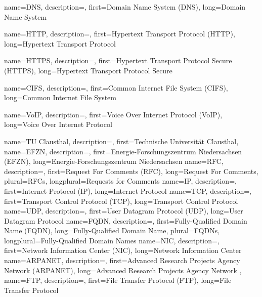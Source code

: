 {%
    name={DNS},
    description={},
    first={Domain Name System (DNS)},
    long={Domain Name System}
}

{%
    name={HTTP},
    description={},
    first={Hypertext Transport Protocol (HTTP)},
    long={Hypertext Transport Protocol}

}
{%
    name={HTTPS},
    description={},
    first={Hypertext Transport Protocol Secure (HTTPS)},
    long={Hypertext Transport Protocol Secure}

}
{%
    name={CIFS},
    description={},
    first={Common Internet File System (CIFS)},
    long={Common Internet File System}

}
{%
    name={VoIP},
    description={},
    first={Voice Over Internet Protocol (VoIP)},
    long={Voice Over Internet Protocol}

}
{%
    name={TU Clausthal},
    description={},
    first={Technische Universität Clausthal},
}
{%
    name={EFZN},
    description={},
    first={Energie-Forschungszentrum Niedersachsen (EFZN)},
    long={Energie-Forschungszentrum Niedersachsen}
}
{%
    name={RFC},
    description={},
    first={Request For Comments (RFC)},
    long={Request For Comments},
    plural={RFCs},
    longplural={Requests for Comments}
}
{%
    name={IP},
    description={},
    first={Internet Protocol (IP)},
    long={Internet Protocol}
}
{%
    name={TCP},
    description={},
    first={Transport Control Protocol (TCP)},
    long={Transport Control Protocol}
}
{%
    name={UDP},
    description={},
    first={User Datagram Protocol (UDP)},
    long={User Datagram Protocol}
}
{%
    name={FQDN},
    description={},
    first={Fully-Qualified Domain Name (FQDN)},
    long={Fully-Qualified Domain Name},
    plural={FQDNs},
    longplural={Fully-Qualified Domain Names}
}
{%
    name={NIC},
    description={},
    first={Network Information Center (NIC)},
    long={Network Information Center}
}
{%
    name={ARPANET},
    description={},
    first={Advanced Research Projects Agency Network (ARPANET)},
    long={Advanced Research Projects Agency Network}
}
,
{%
    name={FTP},
    description={},
    first={File Transfer Protocol (FTP)},
    long={File Transfer Protocol}
}
